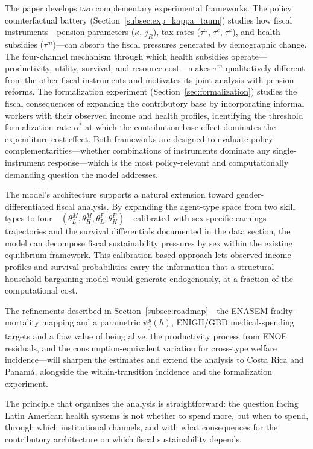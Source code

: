 \documentclass[12pt,a4paper]{article}
\begin{document}
The paper develops two complementary experimental frameworks. The policy counterfactual battery (Section~\ref{subsec:exp_kappa_taum}) studies how fiscal instruments---pension parameters ($\kappa$, $j_R$), tax rates ($\tau^\omega$, $\tau^c$, $\tau^k$), and health subsidies ($\tau^m$)---can absorb the fiscal pressures generated by demographic change. The four-channel mechanism through which health subsidies operate---productivity, utility, survival, and resource cost---makes $\tau^m$ qualitatively different from the other fiscal instruments and motivates its joint analysis with pension reforms. The formalization experiment (Section~\ref{sec:formalization}) studies the fiscal consequences of expanding the contributory base by incorporating informal workers with their observed income and health profiles, identifying the threshold formalization rate $\alpha^*$ at which the contribution-base effect dominates the expenditure-cost effect. Both frameworks are designed to evaluate policy complementarities---whether combinations of instruments dominate any single-instrument response---which is the most policy-relevant and computationally demanding question the model addresses.

The model's architecture supports a natural extension toward gender-differentiated fiscal analysis. By expanding the agent-type space from two skill types to four---$(\theta_L^M, \theta_H^M, \theta_L^F, \theta_H^F)$---calibrated with sex-specific earnings trajectories and the survival differentials documented in the data section, the model can decompose fiscal sustainability pressures by sex within the existing equilibrium framework. This calibration-based approach lets observed income profiles and survival probabilities carry the information that a structural household bargaining model would generate endogenously, at a fraction of the computational cost.

The refinements described in Section~\ref{subsec:roadmap}---the ENASEM frailty--mortality mapping and a parametric $\psi^g_j(h)$, ENIGH/GBD medical-spending targets and a flow value of being alive, the productivity process from ENOE residuals, and the consumption-equivalent variation for cross-type welfare incidence---will sharpen the estimates and extend the analysis to Costa Rica and Panam\'a, alongside the within-transition incidence and the formalization experiment.

The principle that organizes the analysis is straightforward: the question facing Latin American health systems is not whether to spend more, but when to spend, through which institutional channels, and with what consequences for the contributory architecture on which fiscal sustainability depends.
\end{document}
